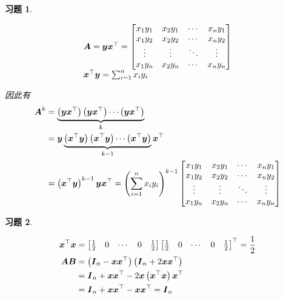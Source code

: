 \documentclass{ctexart}
\newtheorem{problem}{习题}[section]
\begin{document}
\begin{problem}\


\begin{equation*}
    \begin{array}{lll}
        \boldsymbol{A}=\boldsymbol{y}\boldsymbol{x}^\top=
        \begin{bmatrix}
            x_1y_1 & x_2y_1 & \cdots & x_ny_1 \\
            x_1y_2 & x_2y_2 & \cdots & x_ny_2 \\
            \vdots & \vdots & \ddots & \vdots \\
            x_1y_n & x_2y_n & \cdots & x_ny_n \\
        \end{bmatrix}  \\
        \boldsymbol{x}^\top\boldsymbol{y}=\sum_{i=1}^nx_iy_i \\
    \end{array}
\end{equation*}

因此有
\begin{align*}
    \boldsymbol{A}^k & =\underbrace{\left( \boldsymbol{y}\boldsymbol{x}^\top \right)\left( \boldsymbol{y}\boldsymbol{x}^\top \right)\cdots\left( \boldsymbol{y}\boldsymbol{x}^\top \right)}_k                    \\
            & =\boldsymbol{y}\underbrace{\left( \boldsymbol{x}^\top\boldsymbol{y} \right)\left( \boldsymbol{x}^\top\boldsymbol{y} \right)\cdots\left( \boldsymbol{x}^\top\boldsymbol{y} \right)}_{k-1}\boldsymbol{x}^\top \\
            & =\left( \boldsymbol{x}^\top\boldsymbol{y} \right)^{k-1}\boldsymbol{y}\boldsymbol{x}^\top=\left( \sum_{i=1}^nx_iy_i \right)^{k-1}
    \begin{bmatrix}
        x_1y_1 & x_2y_1 & \cdots & x_ny_1 \\
        x_1y_2 & x_2y_2 & \cdots & x_ny_2 \\
        \vdots & \vdots & \ddots & \vdots \\
        x_1y_n & x_2y_n & \cdots & x_ny_n \\
    \end{bmatrix}
\end{align*}

\end{problem}

\begin{problem}\

\begin{align*}
    \boldsymbol{x}^\top\boldsymbol{x} & =
    \begin{bmatrix}
        \frac{1}{2} & 0 & \cdots & 0 & \frac{1}{2}
    \end{bmatrix}
    \begin{bmatrix}
        \frac{1}{2} & 0 & \cdots & 0 & \frac{1}{2}
    \end{bmatrix}^\top=\frac{1}{2}                                         \\
    \boldsymbol{A}\boldsymbol{B}      & =\left( \boldsymbol{I}_n-\boldsymbol{x}\boldsymbol{x}^\top \right)\left( \boldsymbol{I}_n+2\boldsymbol{x}\boldsymbol{x}^\top \right) \\
                    & =\boldsymbol{I}_n+\boldsymbol{x}\boldsymbol{x}^\top-2\boldsymbol{x}\left( \boldsymbol{x}^\top\boldsymbol{x} \right)\boldsymbol{x}^\top \\
                    & =\boldsymbol{I}_n+\boldsymbol{x}\boldsymbol{x}^\top-\boldsymbol{x}\boldsymbol{x}^\top=\boldsymbol{I}_n
\end{align*}

\end{problem}
\end{document}
